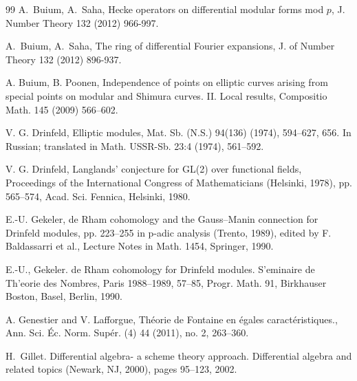 \documentclass{amsart}
\numberwithin {equation}{section}
\begin{document}
\begin{thebibliography}{99}
 A.~Buium,   A.~Saha, Hecke operators on differential 
modular forms mod $p$, J.  Number Theory  132 (2012)  966-997.

 A.~Buium, A.~Saha, The ring of differential Fourier 
expansions,  J. of Number Theory  132 (2012)  896-937.

 A. Buium, B. Poonen, Independence of points on elliptic 
curves arising from special points on modular and Shimura curves. II. 
Local results,  Compositio Math. 145 (2009)  566–602.



V. G. Drinfeld, Elliptic modules, Mat. Sb. (N.S.) 94(136) (1974), 594–627, 656. In Russian; translated in Math. USSR-Sb. 23:4 (1974), 561–592. 

V. G. Drinfeld, Langlands' conjecture for GL(2) over functional fields, Proceedings of the International Congress of Mathematicians (Helsinki, 1978), pp. 565–574, Acad. Sci. Fennica, Helsinki, 1980.

E.-U. Gekeler, de Rham cohomology and the Gauss–Manin connection for Drinfeld modules, pp. 223–255 in
p-adic analysis (Trento, 1989), edited by F. Baldassarri et al., Lecture Notes in Math. 1454, Springer, 1990.

  E.-U., Gekeler. de Rham cohomology for Drinfeld modules. S'eminaire de Th'eorie des Nombres, Paris 1988–1989, 57–85, Progr. Math. 91, Birkhauser Boston, Basel, Berlin, 1990.

A. Genestier and V. Lafforgue, Th{\'e}orie de Fontaine en {\'e}gales caract{\'e}ristiques.,  Ann. Sci. Éc. Norm. Supér. (4) 44 (2011), no. 2, 263–360. 
  
 H.~Gillet.
\newblock Differential algebra- a scheme theory approach.
\newblock Differential algebra and related topics (Newark, NJ, 2000),
  pages 95--123, 2002.



%



\end{thebibliography}
\end{document}
